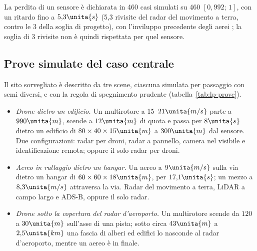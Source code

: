 La perdita di un sensore è dichiarata in 460 casi simulati su 460 $[0{,}992;\,1]$, con un ritardo fino a $5{,}3\unita{s}$ (5,3 rivisite del radar del movimento a terra, contro le 3 della soglia di progetto), con l'inviluppo precedente degli aerei ; la soglia di 3 rivisite non è quindi rispettata per quel sensore.

\subsection{Prove simulate del caso centrale}\label{sec:lp-prove}

Il sito sorvegliato è descritto da tre scene, ciascuna simulata per passaggio con semi diversi, e con la regola di spegnimento prudente (tabella~\ref{tab:lp-prove}).
\begin{itemize}
\item \emph{Drone dietro un edificio.} Un multirotore a 15--$21\unita{m/s}$ parte a $990\unita{m}$, scende a $12\unita{m}$ di quota e passa per $8\unita{s}$ dietro un edificio di $80\times40\times15\unita{m}$ a $300\unita{m}$ dal sensore. Due configurazioni: radar per droni, radar a pannello, camera nel visibile e identificazione remota; oppure il solo radar per droni.
\item \emph{Aereo in rullaggio dietro un hangar.} Un aereo a $9\unita{m/s}$ sulla via dietro un hangar di $60\times60\times18\unita{m}$, per $17{,}1\unita{s}$; un mezzo a $8{,}3\unita{m/s}$ attraversa la via. Radar del movimento a terra, LiDAR a campo largo e ADS-B, oppure il solo radar.
\item \emph{Drone sotto la copertura del radar d'aeroporto.} Un multirotore scende da $120$ a $30\unita{m}$ sull'asse di una pista; sotto circa $43\unita{m}$ a $2{,}5\unita{km}$ una fascia di alberi ed edifici lo nasconde al radar d'aeroporto, mentre un aereo è in finale.
\end{itemize}

